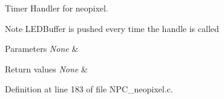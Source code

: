 Timer Handler for neopixel. 

\begin{DoxyNote}{Note}
L\+E\+D\+Buffer is pushed every time the handle is called 
\end{DoxyNote}

\begin{DoxyParams}{Parameters}
{\em None} & \\
\hline
\end{DoxyParams}

\begin{DoxyRetVals}{Return values}
{\em None} & \\
\hline
\end{DoxyRetVals}


Definition at line 183 of file N\+P\+C\+\_\+neopixel.\+c.


